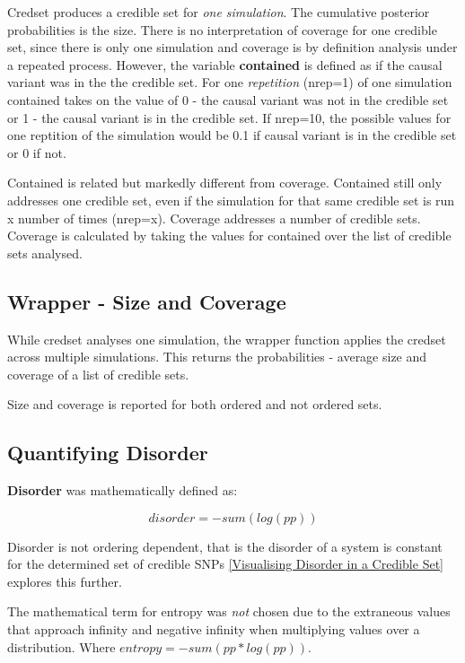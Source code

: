 Credset produces a credible set for \textit{one simulation}. The cumulative posterior probabilities is the size. There is no interpretation of coverage for one credible set, since there is only one simulation and coverage is by definition analysis under a repeated process. However, the variable \textbf{contained} is defined as if the causal variant was in the the credible set. For one \textit{repetition} (nrep=1) of one simulation contained takes on the value of 0 - the causal variant was not in the credible set or 1 - the causal variant is in the credible set. If nrep=10, the possible values for one reptition of the simulation would be 0.1 if causal variant is in the credible set or 0 if not. 

Contained is related but markedly different from coverage. Contained still only addresses one credible set, even if the simulation for that same credible set is run x number of times (nrep=x). Coverage addresses a number of credible sets. Coverage is calculated by taking the values for contained over the list of credible sets analysed. 

\subsection{Wrapper - Size and Coverage}
While credset analyses one simulation, the wrapper function applies the credset across multiple simulations. This returns the probabilities - average size and coverage of a list of credible sets. 

Size and coverage is reported for both ordered and not ordered sets.


\subsection{Quantifying Disorder}
\textbf{Disorder} was mathematically defined as:

\begin{equation}
    disorder = -sum(log(pp))
\end{equation}

Disorder is not ordering dependent, that is the disorder of a system is constant for the determined set of credible SNPs \ref{Visualising Disorder in a Credible Set} explores this further. 


The mathematical term for entropy was \textit{not} chosen due to the extraneous values that approach infinity and negative infinity when multiplying values over a distribution. 
Where $entropy = -sum(pp*log(pp))$.

